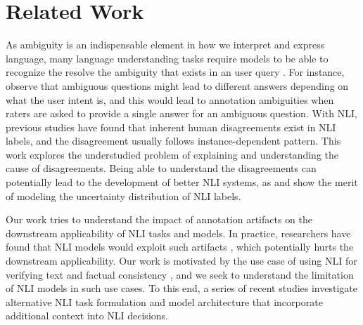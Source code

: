 \section{Related Work}
\label{sec:related}
As ambiguity is an indispensable element in how we interpret and express language, many language understanding tasks require models to be able to recognize the resolve the ambiguity that exists in an user query \cite{xu-etal-2019-asking,zamani2020mimics,stelmakh-etal-2022-asqa,feng-etal-2023-generic,zhao2024beyond}. For instance,  \citet{min-etal-2020-ambigqa} observe that ambiguous questions might lead to different answers depending on what the user intent is, and this would lead to annotation ambiguities when raters are asked to provide a single answer for an ambiguous question. With NLI, previous studies \cite{pavlick-kwiatkowski-2019-inherent,nie-etal-2020-learn} have found that inherent human disagreements exist in NLI labels, and the disagreement usually follows instance-dependent pattern.   
This work explores the understudied problem of explaining and understanding the cause of disagreements. Being able to understand the disagreements can potentially lead to the development of better NLI systems, as 
\citet{zhou-etal-2022-distributed} and \citet{zhang-de-marneffe-2021-identifying} show the merit of modeling the uncertainty distribution of NLI labels.

Our work tries to understand the impact of annotation artifacts \cite{gururangan-etal-2018-annotation, bowman-etal-2020-new} on the downstream applicability of NLI tasks and models. In practice, researchers have found that NLI models would exploit such artifacts  \cite{poliak-etal-2018-hypothesis, mccoy-etal-2019-right}, which potentially hurts the downstream applicability. Our work is motivated by the use case of using NLI for verifying text and factual consistency \cite{schuster-etal-2021-get, schuster-etal-2022-stretching, honovich-etal-2022-true, gao-etal-2023-rarr}, and we seek to understand the limitation of NLI models in such use cases. To this end, a series of recent studies \cite{chen-etal-2023-propsegment, chen-etal-2024-sub, havaldar2025entailed} investigate alternative NLI task formulation and model architecture that incorporate additional context into NLI decisions. 

